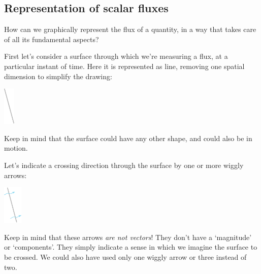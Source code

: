 \documentclass[a4paper,12pt,%
onecolumn,oneside,%
british%
]{memoir}
\renewcommand*{\|}[1][]{\nonscript\:#1\vert\nonscript\:\mathopen{}}
\begin{document}
\subsection{Representation of scalar fluxes}
\label{sec:flux_scalar_representation}


How can we graphically represent the flux of a quantity, in a way that takes care of all its fundamental aspects?

First let's consider a surface through which we're measuring a flux, at a particular instant of time. Here it is represented as line, removing one spatial dimension to simplify the drawing:\noprelistbreak
\begin{center}
  \medskip
  \includegraphics[height=5em]{images/surface_tilted_nocross.pdf}
\end{center}
Keep in mind that the surface could have any other shape, and could also be in motion.

Let's indicate a crossing direction through the surface by one or more wiggly arrows:\noprelistbreak
\begin{center}
  \medskip
  \includegraphics[height=5em]{images/surface_tilted_crossright.pdf}
\end{center}
Keep in mind that these arrows \emph{are not vectors}! They don't have a \enquote*{magnitude} or \enquote*{components}. They simply indicate a sense in which we imagine the surface to be crossed. We could also have used only one wiggly arrow or three instead of two.
\end{document}
